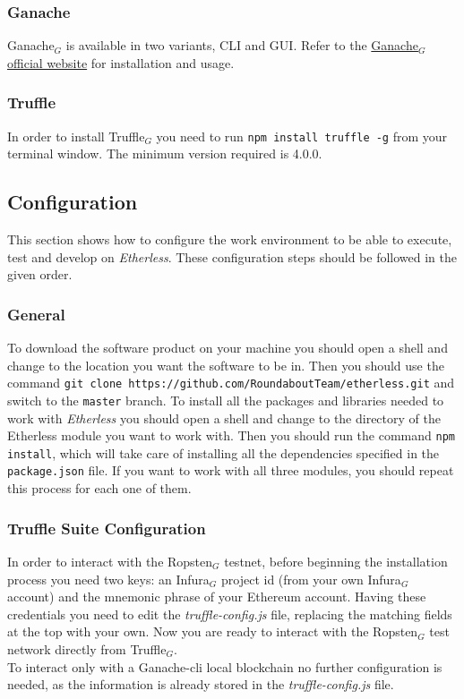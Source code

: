 \subsubsection{Ganache}
	Ganache$_{G}$ is available in two variants, CLI and GUI. Refer to the \href{https://www.trufflesuite.com/docs/ganache/quickstart}{Ganache$_{G}$ official website} for installation and usage.
\subsubsection{Truffle}
 In order to install Truffle$_{G}$ you need to run \texttt{npm install truffle -g} from your terminal window. The minimum version required is 4.0.0.
\subsection{Configuration}
This section shows how to configure the work environment to be able to execute, test and develop on \textit{Etherless}. These configuration steps should be followed in the given order.
\subsubsection{General}
To download the software product on your machine you should open a shell and change to the location you want the software to be in. Then you should use the command \texttt{git clone https://github.com/RoundaboutTeam/etherless.git} and switch to the \texttt{master} branch.
To install all the packages and libraries needed to work with \textit{Etherless} you should open a shell and change to the directory of the Etherless module you want to work with. Then you should run the command \texttt{npm install}, which will take care of installing all the dependencies specified in the \texttt{package.json} file. If you want to work with all three modules, you should repeat this process for each one of them.
\subsubsection{Truffle Suite Configuration}
	In order to interact with the Ropsten$_{G}$ testnet, before beginning the installation process you need two keys: an Infura$_{G}$ project id (from your own Infura$_{G}$ account) and the mnemonic phrase of your Ethereum account. Having these credentials you need to edit the \textit{truffle-config.js} file, replacing the matching fields at the top with your own. Now you are ready to interact with the Ropsten$_{G}$ test network directly from Truffle$_{G}$.\\
	To interact only with a Ganache-cli local blockchain no further configuration is needed, as the information is already stored in the \textit{truffle-config.js} file.
